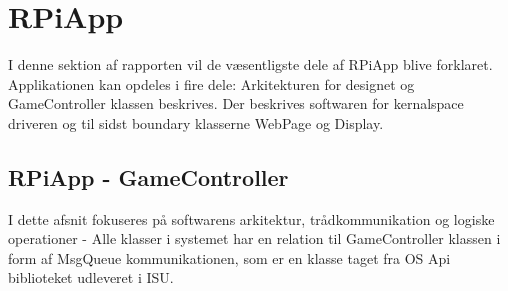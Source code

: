 \documentclass[Rapport/Rapport_main.tex]{subfiles}
\begin{document}
\section{RPiApp}
I denne sektion af rapporten vil de væsentligste dele af RPiApp blive forklaret. Applikationen kan opdeles i fire dele: Arkitekturen for designet og GameController klassen beskrives. Der beskrives softwaren for kernalspace driveren og til sidst boundary klasserne WebPage og Display.
\subsection{RPiApp - GameController}
I dette afsnit fokuseres på softwarens arkitektur, trådkommunikation og logiske operationer - Alle klasser i systemet har en relation til GameController klassen i form af MsgQueue kommunikationen, som er en klasse taget fra OS Api biblioteket udleveret i ISU\autocite{MSGQUEUE}.
\end{document}
